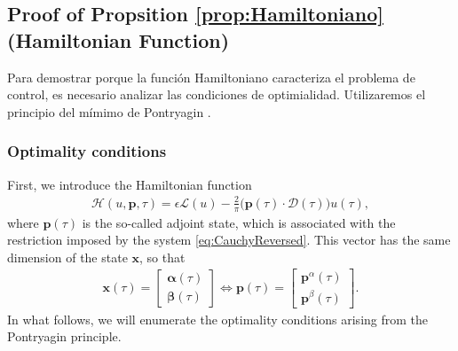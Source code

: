 
\subsection{Proof of Propsition \ref{prop:Hamiltoniano} (Hamiltonian Function)}\label{proof:Hamiltoniano}

Para demostrar porque la función Hamiltoniano caracteriza el problema de control, es necesario analizar las condiciones de optimialidad. Utilizaremos el principio del mímimo de Pontryagin \cite[Chapter~2.7]{bryson1975applied}.

\subsubsection{Optimality conditions}

First, we introduce the Hamiltonian function 
\begin{align*}\label{eq:hamil}
    \mathcal{H}(u,\bm{p},\tau) = \epsilon \mathcal{L}(u) - \frac 2\pi\big(\bm{p}(\tau) \cdot \bm{\mathcal{D}}(\tau)\big)u(\tau),
\end{align*}
where $\bm{p}(\tau)$ is the so-called adjoint state, which is associated with the restriction imposed by the system \eqref{eq:CauchyReversed}. This vector has the same dimension of the state $\bm{x}$, so that
\begin{gather}
  \bm{x}(\tau) = \begin{bmatrix} \bm{\alpha}(\tau) \\ \bm{\beta}(\tau) \end{bmatrix} \Leftrightarrow 
  \bm{p}(\tau) = \begin{bmatrix} \bm{p}^\alpha(\tau) \\ \bm{p}^\beta(\tau) \end{bmatrix}.
\end{gather}
In what follows, we will enumerate the optimality conditions arising from the Pontryagin principle.
